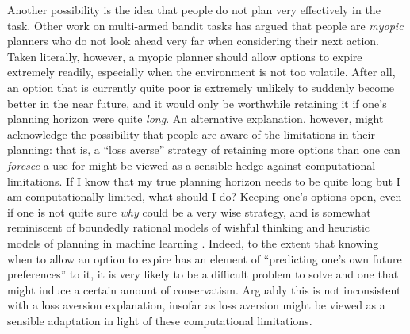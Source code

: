 \documentclass[a4paper,doc,natbib]{apa6}
\begin{document}
Another possibility is the idea that people do not plan very effectively in the task. Other work on multi-armed bandit tasks has argued that people are {\it myopic} planners \citep{zhang2013forgetful} who do not look ahead very far when considering their next action. Taken literally, however, a myopic planner should allow options to expire extremely readily, especially when the environment is not too volatile. After all, an option that is currently quite poor is extremely unlikely to suddenly become better in the near future, and it would only be worthwhile retaining it if one's planning horizon were quite {\it long}. An alternative explanation, however, might acknowledge the possibility that people are aware of the limitations in their planning: that is, a ``loss averse'' strategy of retaining more options than one can {\it foresee} a use for might be viewed as a sensible hedge against computational limitations. If I know that my true planning horizon needs to be quite long but I am computationally limited, what should I do? Keeping one's options open, even if one is not quite sure {\it why} could be a very wise strategy, and is somewhat reminiscent of boundedly rational models of wishful thinking \citep{neuman2014bounded} and heuristic models of planning in machine learning \citep{szita2008many}. Indeed, to the extent that knowing when to allow an option to expire has an element of ``predicting one's own future preferences'' to it, it is very likely to be a difficult problem to solve \citep{loewenstein1997predicting} and one that might induce a certain amount of conservatism. Arguably this is not inconsistent with a loss aversion explanation, insofar as loss aversion might be viewed as a sensible adaptation in light of these computational limitations.
\end{document}
